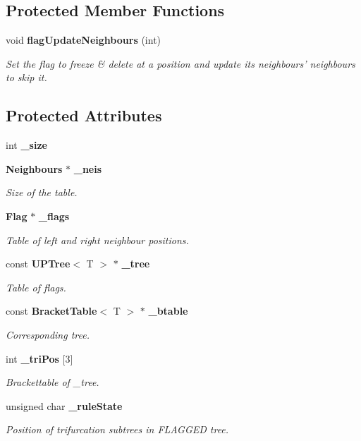 \subsection*{Protected Member Functions}
\begin{CompactItemize}
\item 
void {\bf flag\-Update\-Neighbours} (int)
\begin{CompactList}\small\item\em Set the flag to freeze \& delete at a position and update its neighbours' neighbours to skip it. \item\end{CompactList}\end{CompactItemize}
\subsection*{Protected Attributes}
\begin{CompactItemize}
\item 
int {\bf \_\-size}
\item 
{\bf Neighbours} $\ast$ {\bf \_\-neis}
\begin{CompactList}\small\item\em Size of the table. \item\end{CompactList}\item 
{\bf Flag} $\ast$ {\bf \_\-flags}
\begin{CompactList}\small\item\em Table of left and right neighbour positions. \item\end{CompactList}\item 
const {\bf UPTree}$<$ T $>$ $\ast$ {\bf \_\-tree}
\begin{CompactList}\small\item\em Table of flags. \item\end{CompactList}\item 
const {\bf Bracket\-Table}$<$ T $>$ $\ast$ {\bf \_\-btable}
\begin{CompactList}\small\item\em Corresponding tree. \item\end{CompactList}\item 
int {\bf \_\-tri\-Pos} [3]
\begin{CompactList}\small\item\em Brackettable of \_\-tree. \item\end{CompactList}\item 
unsigned char {\bf \_\-rule\-State}
\begin{CompactList}\small\item\em Position of trifurcation subtrees in FLAGGED tree. \item\end{CompactList}\end{CompactItemize}
